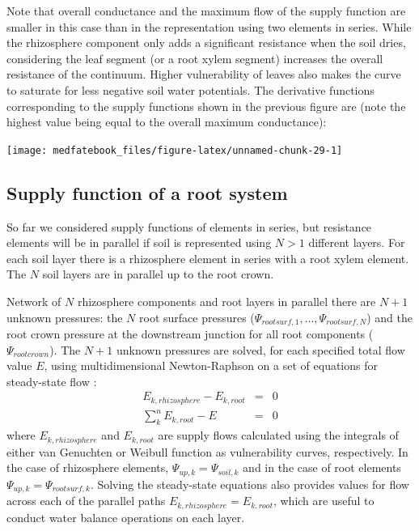 \documentclass[]{book}
\begin{document}
Note that overall conductance and the maximum flow of the supply function are smaller in this case than in the representation using two elements in series. While the rhizosphere component only adds a significant resistance when the soil dries, considering the leaf segment (or a root xylem segment) increases the overall resistance of the continuum. Higher vulnerability of leaves also makes the curve to saturate for less negative soil water potentials. The derivative functions corresponding to the supply functions shown in the previous figure are (note the highest value being equal to the overall maximum conductance):

\begin{center}\texttt{[image: medfatebook\_files/figure-latex/unnamed-chunk-29-1]} \end{center}

\hypertarget{supply-function-of-a-root-system}{%
\subsection{Supply function of a root system}\label{supply-function-of-a-root-system}}

So far we considered supply functions of elements in series, but resistance elements will be in parallel if soil is represented using \(N>1\) different layers. For each soil layer there is a rhizosphere element in series with a root xylem element. The \(N\) soil layers are in parallel up to the root crown.

Network of \(N\) rhizosphere components and root layers in parallel there are \(N+1\) unknown pressures: the \(N\) root surface pressures (\(\Psi_{rootsurf,1},\dots,\Psi_{rootsurf,N}\)) and the root crown pressure at the downstream junction for all root components (\(\Psi_{rootcrown}\)). The \(N+1\) unknown pressures are solved, for each specified total flow value \(E\), using multidimensional Newton-Raphson on a set of equations for steady-state flow \citep{Sperry2016a}:
\begin{eqnarray}
   E_{k, rhizosphere}-E_{k,root} &=& 0 \\
   \sum_{k}^{n}{E_{k,root}}-E &=& 0
\end{eqnarray}
where \(E_{k, rhizosphere}\) and \(E_{k, root}\) are supply flows calculated using the integrals of either van Genuchten or Weibull function as vulnerability curves, respectively. In the case of rhizosphere elements, \(\Psi_{up,k}=\Psi_{soil,k}\) and in the case of root elements \(\Psi_{up,k}=\Psi_{rootsurf,k}\). Solving the steady-state equations also provides values for flow across each of the parallel paths \(E_{k, rhizosphere} = E_{k, root}\), which are useful to conduct water balance operations on each layer.
\end{document}
